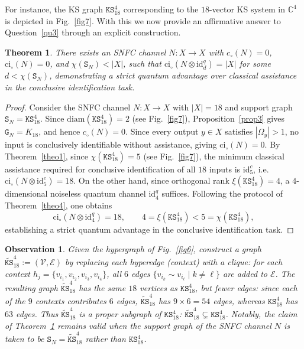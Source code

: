 \documentclass[12pt,a4paper]{article}
\newtheorem{theorem}{Theorem}
\newtheorem{observation}{Observation}
\begin{document}
\noindent For instance, the KS graph $\mathtt{KS}^4_{18}$ corresponding to the $18$-vector KS system in $\mathbb{C}^4$~\cite{Cabello1996} is depicted in Fig.~\ref{fig7}. With this we now provide an affirmative answer to Question~\ref{qu3} through an explicit construction.

\begin{theorem}\label{theo5}
There exists an SNFC channel $N : X \to X$ with $c_\circ(N) = 0$, $\mathrm{ci}_\circ(N) = 0$, and $\chi(\mathtt{S}_N) < |X|$, such that $\mathrm{ci}_\circ(N \otimes \mathrm{id}^q_d) = |X|$ for some $d < \chi(\mathtt{S}_N)$, demonstrating a strict quantum advantage over classical assistance in the conclusive identification task.
\end{theorem}

\begin{proof}
Consider the SNFC channel $N : X \to X$ with $|X| = 18$ and support graph $\mathtt{S}_N = \mathtt{KS}^4_{18}$. Since $\mathrm{diam}(\mathtt{KS}^4_{18}) = 2$ (see Fig.~\ref{fig7}), Proposition~\ref{prop3} gives $\mathtt{G}_N = K_{18}$, and hence $c_\circ(N) = 0$. Since every output $y \in X$ satisfies $|\Omega_y| > 1$, no input is conclusively identifiable without assistance, giving $\mathrm{ci}_\circ(N) = 0$. By Theorem~\ref{theo1}, since $\chi(\mathtt{KS}^4_{18}) = 5$ (see Fig.~\ref{fig7}), the minimum classical assistance required for conclusive identification of all $18$ inputs is $\mathrm{id}^c_5$, i.e.~$\mathrm{ci}_\circ(N \otimes \mathrm{id}^c_5) = 18$. On the other hand, since orthogonal rank $\xi(\mathtt{KS}^4_{18}) = 4$, a $4$-dimensional noiseless quantum channel $\mathrm{id}^q_4$ suffices. Following the protocol of Theorem~\ref{theo4}, one obtains
\begin{equation*}
\mathrm{ci}_\circ(N \otimes \mathrm{id}^q_4) = 18, \qquad  4 = \xi(\mathtt{KS}^4_{18}) < 5 = \chi(\mathtt{KS}^4_{18}),
\end{equation*}
establishing a strict quantum advantage in the conclusive identification task.
\end{proof}

\begin{observation}\label{obs4}
Given the hypergraph of Fig.~\ref{fig6}, construct a graph $\tilde{\mathtt{KS}}^4_{18} := (\mathcal{V}, \mathcal{E})$ by replacing each hyperedge (context) with a clique: for each context $h_j = \{v_{i_1}, v_{i_2}, v_{i_3}, v_{i_4}\}$, all $6$ edges $\{v_{i_k} \sim v_{i_\ell} \mid k \neq \ell\}$ are added to $\mathcal{E}$. The resulting graph $\tilde{\mathtt{KS}}^4_{18}$ has the same $18$ vertices as $\mathtt{KS}^4_{18}$, but fewer edges: since each of the $9$ contexts contributes $6$ edges, $\tilde{\mathtt{KS}}^4_{18}$ has $9 \times 6 = 54$ edges, whereas $\mathtt{KS}^4_{18}$ has $63$ edges. Thus $\tilde{\mathtt{KS}}^4_{18}$ is a proper subgraph of $\mathtt{KS}^4_{18}$: $    \tilde{\mathtt{KS}}^4_{18} \subsetneq \mathtt{KS}^4_{18}$. Notably, the claim of Theorem~\ref{theo5} remains valid when the support graph of the SNFC channel $N$ is taken to be $\mathtt{S}_N = \tilde{\mathtt{KS}}^4_{18}$ rather than $\mathtt{KS}^4_{18}$.
\end{observation}
\end{document}
